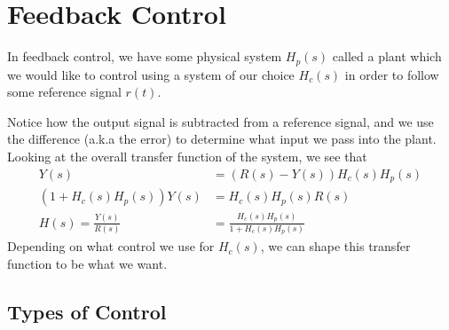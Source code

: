 \documentclass{article}
\begin{document}
\section{Feedback Control}
In feedback control, we have some physical system $H_p(s)$ called a plant which we would like to control using a system of our choice $H_c(s)$
in order to follow some reference signal $r(t)$.
\begin{figure}[H]
    \centering
    
\end{figure}
Notice how the output signal is subtracted from a reference signal, and we use the difference (a.k.a the error)
to determine what input we pass into the plant. Looking at the overall transfer function of the system, we see that
\begin{align*}
    Y(s) &= (R(s)-Y(s))H_c(s)H_p(s)\\
    (1+H_c(s)H_p(s))Y(s) &= H_c(s)H_p(s)R(s)\\
    H(s) = \frac{Y(s)}{R(s)} &= \frac{H_c(s)H_p(s)}{1+H_c(s)H_p(s)}
\end{align*}
Depending on what control we use for $H_c(s)$, we can shape this transfer function to be what we want.
\subsection{Types of Control}
\end{document}
